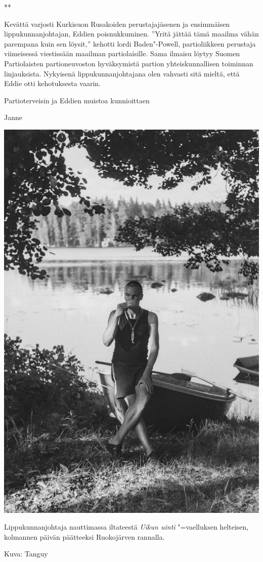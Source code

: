 \begin{multicols}{2}
{\smallskip\noindent\centering ***\par\smallskip}

Kevättä varjosti Kurkisuon Rusakoiden perustajajäsenen ja ensimmäisen lippukunnanjohtajan, Eddien poisnukkuminen. ''Yritä jättää tämä maailma vähän parempana kuin sen löysit,'' kehotti lordi Baden"-Powell, partioliikkeen perustaja viimeisessä viestissään maailman partiolaisille. Sama ilmaisu löytyy Suomen Partiolaisten partioneuvoston hyväksymistä partion yhteiskunnallisen toiminnan linjauksista. Nykyisenä lippukunnanjohtajana olen vahvasti sitä mieltä, että Eddie otti kehotuksesta vaarin.

Partioterveisin ja Eddien muistoa kunnioittaen

\smallskip

\noindent\hfill Janne

\vspace*{12.5cm}

\columnbreak

\null\vfill

\noindent\includegraphics[width=\linewidth]{assets/lpkjohtajantervehdys} \\ {\small Lippukunnanjohtaja nauttimassa iltateestä \textit{Uikun uinti} "=vaelluksen helteisen, kolmannen päivän päätteeksi Ruokojärven rannalla.\par}

\bigskip

\noindent\null\hfill Kuva: Tanguy
\end{multicols}
